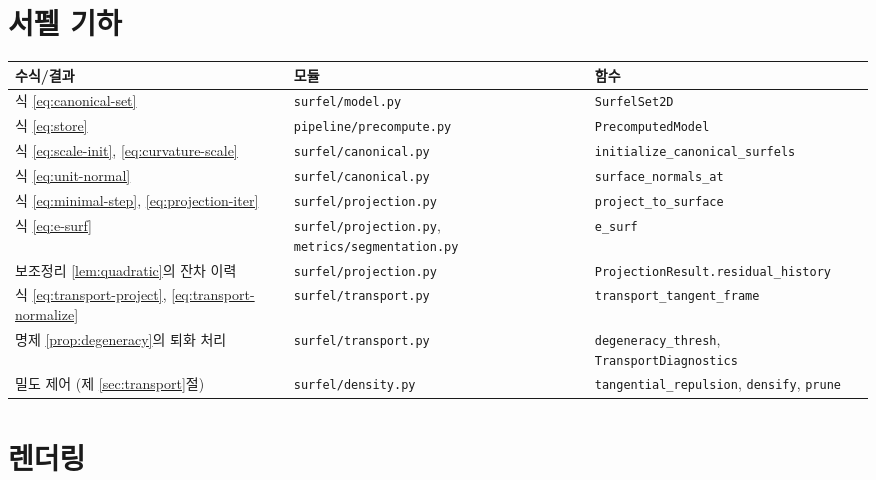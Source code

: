 \section{서펠 기하}

\begin{longtable}{@{}p{3.6cm}p{4.6cm}p{5.2cm}@{}}
\toprule
수식/결과 & 모듈 & 함수 \\
\midrule
\endhead
식 \eqref{eq:canonical-set} & \texttt{surfel/model.py} & \texttt{SurfelSet2D} \\
식 \eqref{eq:store} & \texttt{pipeline/precompute.py} & \texttt{PrecomputedModel} \\
식 \eqref{eq:scale-init}, \eqref{eq:curvature-scale} & \texttt{surfel/canonical.py}
  & \texttt{initialize\_canonical\_surfels} \\
식 \eqref{eq:unit-normal} & \texttt{surfel/canonical.py} & \texttt{surface\_normals\_at} \\
식 \eqref{eq:minimal-step}, \eqref{eq:projection-iter} & \texttt{surfel/projection.py}
  & \texttt{project\_to\_surface} \\
식 \eqref{eq:e-surf} & \texttt{surfel/projection.py}, \texttt{metrics/segmentation.py}
  & \texttt{e\_surf} \\
보조정리 \ref{lem:quadratic}의 잔차 이력 & \texttt{surfel/projection.py}
  & \texttt{ProjectionResult.residual\_history} \\
식 \eqref{eq:transport-project}, \eqref{eq:transport-normalize} & \texttt{surfel/transport.py}
  & \texttt{transport\_tangent\_frame} \\
명제 \ref{prop:degeneracy}의 퇴화 처리 & \texttt{surfel/transport.py}
  & \texttt{degeneracy\_thresh}, \texttt{TransportDiagnostics} \\
밀도 제어 (제 \ref{sec:transport}절) & \texttt{surfel/density.py}
  & \texttt{tangential\_repulsion}, \texttt{densify}, \texttt{prune} \\
\bottomrule
\end{longtable}

\section{렌더링}


